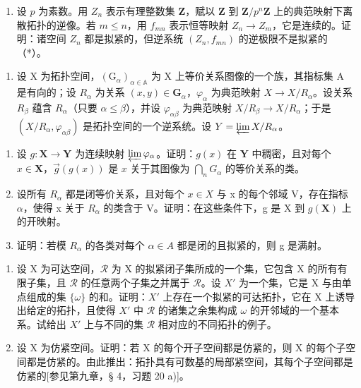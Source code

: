 \begin{enumerate}
\def\labelenumi{\alph{enumi})}
\setcounter{enumi}{1}
\tightlist
\item
  设 \(p\) 为素数。用 \(Z_{n}\) 表示有理整数集 \(\mathbf{Z}\)，赋以 \(\mathbf{Z}\) 到 \(\mathbf{Z} / p^{n}\mathbf{Z}\) 上的典范映射下离散拓扑的逆像。若 \(m \leqslant n\)，用 \(f_{mn}\) 表示恒等映射 \(Z_{n} \to Z_{m}\)，它是连续的。证明：诸空间 \(Z_{n}\) 都是拟紧的，但逆系统 \((Z_{n}, f_{mn})\) 的逆极限不是拟紧的（*）。
\end{enumerate}

\begin{enumerate}
\def\labelenumi{\arabic{enumi})}
\setcounter{enumi}{7}
\tightlist
\item
  设 X 为拓扑空间，\((\mathrm{G}_{\alpha})_{\alpha\in\mathbb{A}}\) 为 X 上等价关系图像的一个族，其指标集 A 是有向的；设 \(R_{\alpha}\) 为关系 \((x,y)\in\mathbf{G}_{\alpha}\)，\(\varphi_{\alpha}\) 为典范映射 \(X\to X/R_{\alpha}\)。设关系 \(R_{\beta}\) 蕴含 \(R_{\alpha}\)（只要 \(\alpha\leqslant\beta\)），并设 \(\varphi_{\alpha\beta}\) 为典范映射 \(X/R_{\beta}\to X/R_{\alpha}\)；于是 \((X/R_{\alpha},\varphi_{\alpha\beta})\) 是拓扑空间的一个逆系统。设 \(Y=\varprojlim X/R_{\alpha}\)。
\end{enumerate}

\begin{enumerate}
\def\labelenumi{\alph{enumi})}
\item
  设 \(g: \mathbf{X} \to \mathbf{Y}\) 为连续映射 \(\varprojlim \varphi_{\alpha}\)。证明：\(g(x)\) 在 \(\mathbf{Y}\) 中稠密，且对每个 \(x \in \mathbf{X}\)，\(\overrightarrow{g}(g(x))\) 是 \(x\) 关于其图像为 \(\bigcap_{n} G_{\alpha}\) 的等价关系的类。
\item
  设所有 \(R_{\alpha}\) 都是闭等价关系，且对每个 \(x \in X\) 与 x 的每个邻域 V，存在指标 \(\alpha\)，使得 x 关于 \(R_{\alpha}\) 的类含于 V。证明：在这些条件下，g 是 X 到 \(g(\mathbf{X})\) 上的开映射。
\item
  证明：若模 \(R_{\alpha}\) 的各类对每个 \(\alpha \in A\) 都是闭的且拟紧的，则 g 是满射。
\end{enumerate}

\begin{enumerate}
\def\labelenumi{\arabic{enumi})}
\setcounter{enumi}{8}
\item
  设 X 为可达空间，\(\mathcal{R}\) 为 X 的拟紧闭子集所成的一个集，它包含 X 的所有有限子集，且 \(\mathcal{R}\) 的任意两个子集之并属于 \(\mathcal{R}\)。设 \(X'\) 为一个集，它是 X 与由单点组成的集 \(\{\omega\}\) 的和。证明：\(X'\) 上存在一个拟紧的可达拓扑，它在 X 上诱导出给定的拓扑，且使得 \(X'\) 中 \(\mathcal{R}\) 的诸集之余集构成 \(\omega\) 的开邻域的一个基本系。试给出 \(X'\) 上与不同的集 \(\mathcal{R}\) 相对应的不同拓扑的例子。
\item
  设 X 为仿紧空间。证明：若 X 的每个开子空间都是仿紧的，则 X 的每个子空间都是仿紧的。由此推出：拓扑具有可数基的局部紧空间，其每个子空间都是仿紧的{[}参见第九章，§ 4，习题 20 a){]}。
\end{enumerate}

